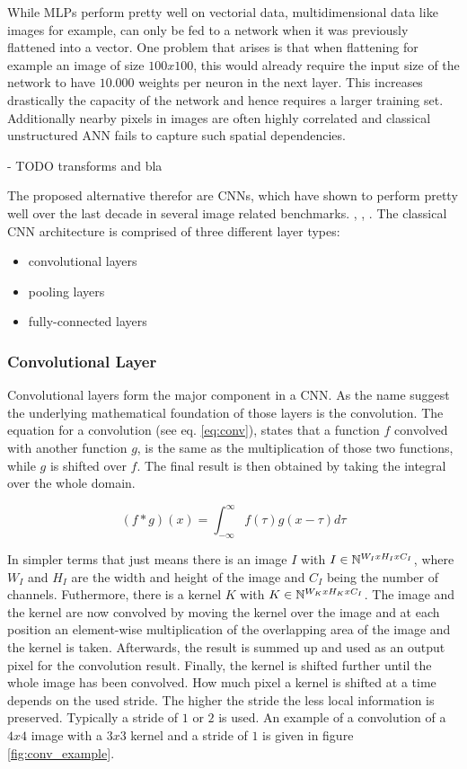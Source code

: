 While \ac{MLPs} perform pretty well on vectorial data, multidimensional data like images for example, can only be fed to a network when it was previously flattened into a vector.
One problem that arises is that when flattening for example an image of size $100x100$, this would already require the input size of the network to have $10.000$ weights per neuron in the next layer.
This increases drastically the capacity of the network and hence requires a larger training set.
Additionally nearby pixels in images are often highly correlated and classical unstructured \ac{ANN} fails to capture such spatial dependencies. \cite{lecun_lenet}

- TODO transforms and bla

The proposed alternative therefor are \ac{CNNs}, which have shown to perform pretty well over the last decade in several image related benchmarks. \cite{inception}, \cite{resnet}, \cite{densenet}.
The classical \ac{CNN} architecture is comprised of three different layer types:

\begin{itemize}
    \item convolutional layers
    \item pooling layers
    \item fully-connected layers
\end{itemize}

\subsubsection{Convolutional Layer}
Convolutional layers form the major component in a \ac{CNN}.
As the name suggest the underlying mathematical foundation of those layers is the convolution.
The equation for a convolution (see eq. \ref{eq:conv}), states that a function $f$ convolved with another function $g$, is the same as the multiplication of those two functions, while $g$ is shifted over $f$.
The final result is then obtained by taking the integral over the whole domain. \cite{dl}

\begin{equation}
    (f * g)(x) = \int_{-\infty}^{\infty}f(\tau)g(x - \tau)d\tau
    \label{eq:conv}
\end{equation}

In simpler terms that just means there is an image $I$ with $I \in \mathbb{N}^{W_IxH_IxC_I}$, where $W_I$ and $H_I$ are the width and height of the image and $C_I$ being the number of channels.
Futhermore, there is a kernel $K$ with $K \in \mathbb{N}^{W_KxH_KxC_I}$.
The image and the kernel are now convolved by moving the kernel over the image and at each position an element-wise multiplication of the overlapping area of the image and the kernel is taken.
Afterwards, the result is summed up and used as an output pixel for the convolution result.
Finally, the kernel is shifted further until the whole image has been convolved.
How much pixel a kernel is shifted at a time depends on the used stride.
The higher the stride the less local information is preserved.
Typically a stride of $1$ or $2$ is used.
An example of a convolution of a $4x4$ image with a $3x3$ kernel and a stride of $1$ is given in figure \ref{fig:conv_example}.

